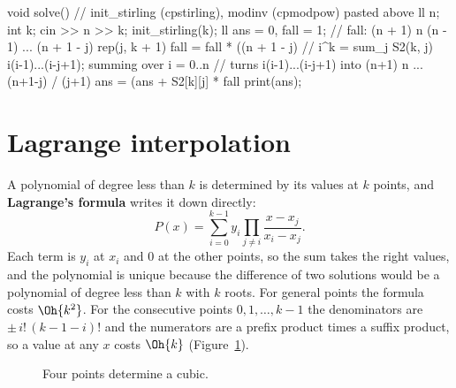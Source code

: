 \begin{code}
void solve() {  // init_stirling (cpstirling), modinv (cpmodpow) pasted above
    ll n;
    int k;
    cin >> n >> k;
    init_stirling(k);
    ll ans = 0, fall = 1;  // fall: (n + 1) n (n - 1) ... (n + 1 - j)
    rep(j, k + 1) {
        fall = fall * ((n + 1 - j) %
        // i^k = sum_j S2(k, j) i(i-1)...(i-j+1); summing over i = 0..n
        // turns i(i-1)...(i-j+1) into (n+1) n ... (n+1-j) / (j+1)
        ans = (ans + S2[k][j] * fall %
    }
    print(ans);
}
\end{code}

\section[Lagrange interpolation]{Lagrange interpolation \hfill \ioi}\label{sec:lagrange}

A polynomial of degree less than $k$ is determined by its values at $k$ points, and \textbf{Lagrange's formula} writes it down
directly:
\[
  P(x) = \sum_{i=0}^{k-1} y_i \prod_{j \ne i} \frac{x - x_j}{x_i - x_j} .
\]
Each term is $y_i$ at $x_i$ and 0 at the other points, so the sum takes the right values, and the polynomial is unique because the
difference of two solutions would be a polynomial of degree less than $k$ with $k$ roots. For general points the formula costs
$\Oh{k^2}$. For the consecutive points $0, 1, \dots, k - 1$ the denominators are $\pm\, i!\,(k - 1 - i)!$ and the numerators are a prefix
product times a suffix product, so a value at any $x$ costs $\Oh{k}$ (Figure~\ref{fig:lagrange}).

\begin{figure}[htbp]
\centering
{}
\caption{Four points determine a cubic.}
\label{fig:lagrange}
\end{figure}

